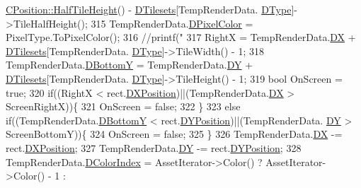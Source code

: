 \begin{DoxyCode}
      \hyperlink{classCPosition_a5e371060b1aa0d3d3c5df1e353e0e5fd}{CPosition::HalfTileHeight}() - \hyperlink{classCAssetRenderer_ae8201de704851c1de6424a8da77b785e}{DTilesets}[TempRenderData.
      \hyperlink{structSAssetRenderData_ae986cfe9d4238fa31fb511b40392d97f}{DType}]->TileHalfHeight();
315             TempRenderData.\hyperlink{structSAssetRenderData_a94ac857717a32afcd7118316df5f8d88}{DPixelColor} = PixelType.ToPixelColor();
316             \textcolor{comment}{//printf("%
317             RightX = TempRenderData.\hyperlink{structSAssetRenderData_ab432edfd1146e38a92576b78e2ad5581}{DX} + \hyperlink{classCAssetRenderer_ae8201de704851c1de6424a8da77b785e}{DTilesets}[TempRenderData.
      \hyperlink{structSAssetRenderData_ae986cfe9d4238fa31fb511b40392d97f}{DType}]->TileWidth() - 1;
318             TempRenderData.\hyperlink{structSAssetRenderData_a187b7d405b649f0f400a3a8204ef7de2}{DBottomY} = TempRenderData.\hyperlink{structSAssetRenderData_af27e8a46e21a0935983bfc0d34d9ceba}{DY} + \hyperlink{classCAssetRenderer_ae8201de704851c1de6424a8da77b785e}{DTilesets}[TempRenderData.
      \hyperlink{structSAssetRenderData_ae986cfe9d4238fa31fb511b40392d97f}{DType}]->TileHeight() - 1;
319             \textcolor{keywordtype}{bool} OnScreen = \textcolor{keyword}{true};
320             \textcolor{keywordflow}{if}((RightX < rect.\hyperlink{structSRectangle_abcbddb03b3ee416cc33109833b5f075c}{DXPosition})||(TempRenderData.\hyperlink{structSAssetRenderData_ab432edfd1146e38a92576b78e2ad5581}{DX} > ScreenRightX))\{
321                 OnScreen = \textcolor{keyword}{false};
322             \}
323             \textcolor{keywordflow}{else} \textcolor{keywordflow}{if}((TempRenderData.\hyperlink{structSAssetRenderData_a187b7d405b649f0f400a3a8204ef7de2}{DBottomY} < rect.\hyperlink{structSRectangle_a120aa0a90033bc6e07c36c151a3bbc71}{DYPosition})||(TempRenderData.
      \hyperlink{structSAssetRenderData_af27e8a46e21a0935983bfc0d34d9ceba}{DY} > ScreenBottomY))\{
324                 OnScreen = \textcolor{keyword}{false};   
325             \}
326             TempRenderData.\hyperlink{structSAssetRenderData_ab432edfd1146e38a92576b78e2ad5581}{DX} -= rect.\hyperlink{structSRectangle_abcbddb03b3ee416cc33109833b5f075c}{DXPosition};
327             TempRenderData.\hyperlink{structSAssetRenderData_af27e8a46e21a0935983bfc0d34d9ceba}{DY} -= rect.\hyperlink{structSRectangle_a120aa0a90033bc6e07c36c151a3bbc71}{DYPosition};
328             TempRenderData.\hyperlink{structSAssetRenderData_a589dca7066d667b74c954b9b16671454}{DColorIndex} = AssetIterator->Color() ? AssetIterator->Color() - 1 : 
}
\end{DoxyCode}
